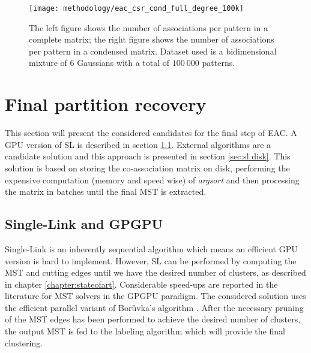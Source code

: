 \begin{figure}[hbtp]
\centering
\texttt{[image: methodology/eac\_csr\_cond\_full\_degree\_100k]}
\caption{The left figure shows the number of associations per pattern in a complete matrix; the right figure shows the number of associations per pattern in a condensed matrix. Dataset used is a bidimensional mixture of 6 Gaussians with a total of $100 \: 000$ patterns.}
\label{fig:coassoc degree}
\end{figure}


\section{Final partition recovery}

This section will present the considered candidates for the final step of EAC.
A GPU version of SL is described in section \ref{sec:sl gpu}.
External algorithms are a candidate solution and this approach is presented in section \ref{sec:sl disk}.
This solution is based on storing the co-association matrix on disk, performing the expensive computation (memory and speed wise) of \emph{argsort} and then processing the matrix in batches until the final MST is extracted.

\subsection{Single-Link and GPGPU}
\label{sec:sl gpu}
Single-Link is an inherently sequential algorithm which means an efficient GPU version is hard to implement.
However, SL can be performed by computing the MST and cutting edges until we have the desired number of clusters, as described in chapter \ref{chapter:stateofart}.
Considerable speed-ups are reported in the literature for MST solvers in the GPGPU paradigm.
The considered solution uses the efficient parallel variant of Borůvka's algorithm \cite{Sousa2015}.
After the necessary pruning of the MST edges has been performed to achieve the desired number of clusters, the output MST is fed to the labeling algorithm which will provide the final clustering.

